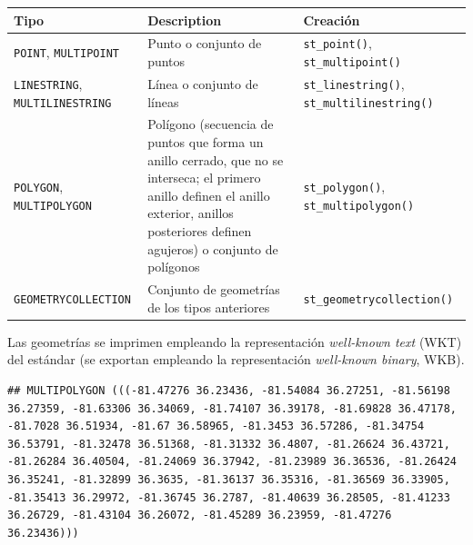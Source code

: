 \documentclass[
  spanish,
]{book}
\newenvironment{Shaded}{\begin{snugshade}}{\end{snugshade}}
\newcommand{\DecValTok}[1]{\textcolor[rgb]{0.00,0.00,0.81}{#1}}
\newcommand{\NormalTok}[1]{#1}
\newcommand{\SpecialCharTok}[1]{\textcolor[rgb]{0.00,0.00,0.00}{#1}}
\theoremstyle{break}
\begin{document}
\begin{longtable}[]{@{}
  >{\raggedright\arraybackslash}p{}
  >{\raggedright\arraybackslash}p{}
  >{\raggedright\arraybackslash}p{}@{}}
\toprule
Tipo & Description & Creación \\
\midrule
\endhead
\texttt{POINT}, \texttt{MULTIPOINT} & Punto o conjunto de puntos & \texttt{st\_point()}, \texttt{st\_multipoint()} \\
\texttt{LINESTRING}, \texttt{MULTILINESTRING} & Línea o conjunto de líneas & \texttt{st\_linestring()}, \texttt{st\_multilinestring()} \\
\texttt{POLYGON}, \texttt{MULTIPOLYGON} & Polígono (secuencia de puntos que forma un anillo cerrado, que no se interseca; el primero anillo definen el anillo exterior, anillos posteriores definen agujeros) o conjunto de polígonos & \texttt{st\_polygon()}, \texttt{st\_multipolygon()} \\
\texttt{GEOMETRYCOLLECTION} & Conjunto de geometrías de los tipos anteriores & \texttt{st\_geometrycollection()} \\
\bottomrule
\end{longtable}

Las geometrías se imprimen empleando la representación \emph{well-known text} (WKT) del estándar (se exportan empleando la representación \emph{well-known binary}, WKB).

\begin{Shaded}
\end{Shaded}

\begin{verbatim}
## MULTIPOLYGON (((-81.47276 36.23436, -81.54084 36.27251, -81.56198 36.27359, -81.63306 36.34069, -81.74107 36.39178, -81.69828 36.47178, -81.7028 36.51934, -81.67 36.58965, -81.3453 36.57286, -81.34754 36.53791, -81.32478 36.51368, -81.31332 36.4807, -81.26624 36.43721, -81.26284 36.40504, -81.24069 36.37942, -81.23989 36.36536, -81.26424 36.35241, -81.32899 36.3635, -81.36137 36.35316, -81.36569 36.33905, -81.35413 36.29972, -81.36745 36.2787, -81.40639 36.28505, -81.41233 36.26729, -81.43104 36.26072, -81.45289 36.23959, -81.47276 36.23436)))
\end{verbatim}
\end{document}
